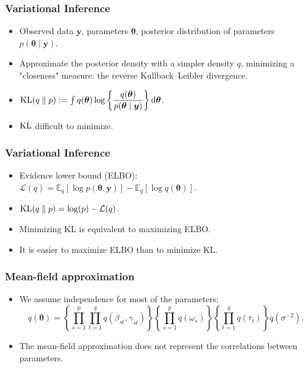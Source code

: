 \documentclass{beamer}
\DeclareMathOperator*{\KL}{{\rm KL}}
\begin{document}
\begin{frame}
\frametitle{Variational Inference}
\begin{itemize}
\item Observed data $\boldsymbol{y}$, parameters $\boldsymbol{\theta}$, posterior distribution of parameters $p(\boldsymbol{\theta} \mid \boldsymbol{y})$.
\item Approximate the posterior density with a simpler density $q$, minimizing a "closeness" measure: the reverse Kullback--Leibler divergence.
\item $\KL(q\parallel p) := \int q(\boldsymbol{\theta})\log \left\lbrace\dfrac{q(\boldsymbol{\theta})}{p(\boldsymbol{\theta} \mid \boldsymbol{y})}\right\rbrace \mathrm{d}\boldsymbol{\theta}$.
\item $\KL$ difficult to minimize.
\end{itemize}
\end{frame}
\begin{frame}
\frametitle{Variational Inference}
\begin{itemize}
\item Evidence lower bound (ELBO): $\mathcal{L}(q) = \mathbb{E}_q\left[\log p(\boldsymbol{\theta},\boldsymbol{y})\right] - \mathbb{E}_q\left[\log q(\boldsymbol{\theta})\right]$.
\item $\KL(q\parallel p) = \log(p) - \mathcal{L}(q)$.
\item Minimizing KL is equivalent to maximizing ELBO.
\item It is easier to maximize ELBO than to minimize KL.
\end{itemize}
\end{frame}

\begin{frame}
\frametitle{Mean-field approximation}
\begin{itemize}
\item We assume independence for most of the parameters:
$$
q(\boldsymbol{\theta}) = \left\lbrace\prod_{s=1}^p\prod_{t=1}^qq(\beta_{st},\gamma_{st})\right\rbrace\left\lbrace\prod_{s=1}^pq(\omega_s)\right\rbrace\left\lbrace\prod_{t=1}^qq(\tau_t)\right\rbrace q(\sigma^{-2}).
$$
\item The mean-field approximation does not represent the correlations between parameters.
\end{itemize}
\begin{figure}
\centering
{}\end{figure}
\end{frame}
\end{document}
